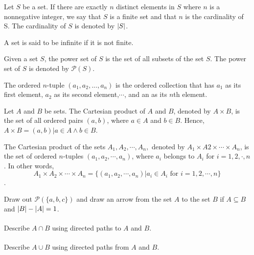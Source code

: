 \begin{defn}[cardinality]
Let $S$ be a set. If there are exactly $n$ distinct elements in $S$ where $n$ is a nonnegative integer,
we say that $S$ is a finite set and that $n$ is the cardinality of S. The cardinality of $S$ is denoted
by $\left\lvert S\right\rvert$.
\end{defn}
\begin{defn}[infinite]
A set is said to be infinite if it is not finite.
\end{defn}
\begin{defn}
Given a set $S$, the power set of $S$ is the set of all subsets of the set $S$. The power set of $S$ is
denoted by $\mathcal{P}(S)$.
\end{defn}
\begin{defn}[$n$-tuple]
The ordered $n$-tuple $(a_1, a_2, . . . , a_n)$ is the ordered collection that has $a_1$ as its first element,
$a_2$ as its second element,$\cdots$, and an as its $n$th element.
\end{defn}
\begin{defn}
Let $A$ and $B$ be sets. The Cartesian product of $A$ and $B$, denoted by $A \times B$, is the set of all
ordered pairs $(a, b)$, where $a \in A$ and $b \in B$. Hence,
$A \times B = {(a, b) | a \in A \land b \in B}$.
\end{defn}
\begin{defn}
The Cartesian product of the sets $A_1,A_2, \cdots , A_n,$ denoted by $A_1 \times A2 \times \cdots \times A_n$, is the
set of ordered $n$-tuples $(a_1, a_2, \cdots , a_n)$, where $a_i$ belongs to $A_i$ for $i = 1, 2, \cdot , n$. In other
words,
\[A_1 \times A_2 \times \cdots \times A_n = \{(a_1, a_2, \cdots , a_n) | a_i \in A_i \text{ for }i = 1, 2,\cdots, n\}\].
\end{defn}
\begin{exmp}
Draw out $\mathcal{P}(\{a,b,c\})$ and draw an arrow from the set  $A$ to the set $B$ if $A\subseteq B$ and $\left\lvert B\right\rvert-\left\lvert A\right\rvert=1$.\\
\vspace{2cm}\\
Describe $A\cap B$ using directed paths to $A$ and $B$.\\
\vspace{1cm}\\
Describe $A\cup B$ using directed paths from $A$ and $B$.\\
\vspace{1cm}\\

\end{exmp}

